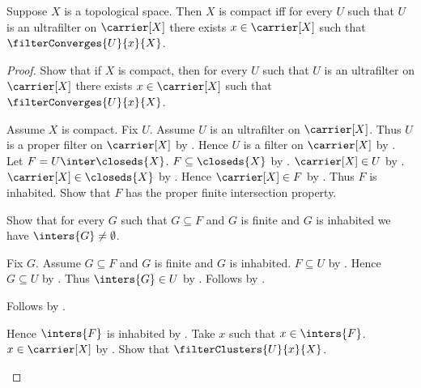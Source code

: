\begin{theorem}\label{compact_iff_every_ultrafilter_converges}
    Suppose $X$ is a topological space.
    Then $X$ is compact iff for every $U$ such that
        $U$ is an ultrafilter on $\carrier[X]$ there exists
        $x\in\carrier[X]$ such that $\filterConverges{U}{x}{X}$.
\end{theorem}
\begin{proof}
    Show that if $X$ is compact, then for every $U$ such that
        $U$ is an ultrafilter on $\carrier[X]$ there exists
        $x\in\carrier[X]$ such that $\filterConverges{U}{x}{X}$.
    \begin{subproof}
        Assume $X$ is compact.
        Fix $U$.
        Assume $U$ is an ultrafilter on $\carrier[X]$.
        Thus $U$ is a proper filter on $\carrier[X]$
            by .
        Hence $U$ is a filter on $\carrier[X]$
            by .
        Let $F=U\inter\closeds{X}$.
        $F\subseteq\closeds{X}$ by .
        $\carrier[X]\in U$ by .
        $\carrier[X]\in\closeds{X}$
            by .
        Hence $\carrier[X]\in F$ by .
        Thus $F$ is inhabited.
        Show that $F$ has the proper finite intersection property.
        \begin{subproof}
            Show that for every $G$ such that $G\subseteq F$ and
                $G$ is finite and $G$ is inhabited we have
                $\inters{G}\neq\emptyset$.
            \begin{subproof}
                Fix $G$.
                Assume $G\subseteq F$ and $G$ is finite and
                    $G$ is inhabited.
                $F\subseteq U$ by .
                Hence $G\subseteq U$ by .
                Thus $\inters{G}\in U$
                    by .
                Follows by .
            \end{subproof}
            Follows by .
        \end{subproof}
        Hence $\inters{F}$ is inhabited
            by .
        Take $x$ such that $x\in\inters{F}$.
        $x\in\carrier[X]$ by .
        Show that $\filterClusters{U}{x}{X}$.
        \begin{subproof}

\end{subproof}
\end{subproof}
\end{proof}
